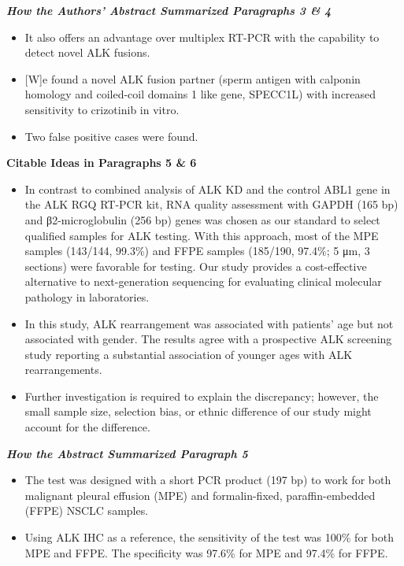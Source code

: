 \documentclass[
]{book}
\providecommand{\tightlist}{%
  \setlength{\itemsep}{0pt}\setlength{\parskip}{0pt}}
\begin{document}
\textbf{\emph{How the Authors' Abstract Summarized Paragraphs 3 \& 4}}

\begin{itemize}
\tightlist
\item
  It also offers an advantage over multiplex RT-PCR with the capability to detect novel ALK fusions.
\item
  {[}W{]}e found a novel ALK fusion partner (sperm antigen with calponin homology and coiled-coil domains 1 like gene, SPECC1L) with increased sensitivity to crizotinib in vitro.
\item
  Two false positive cases were found.
\end{itemize}

\textbf{Citable Ideas in Paragraphs 5 \& 6}

\begin{itemize}
\tightlist
\item
  In contrast to combined analysis of ALK KD and the control ABL1 gene in the ALK RGQ RT-PCR kit, RNA quality assessment with GAPDH (165 bp) and β2-microglobulin (256 bp) genes was chosen as our standard to select qualified samples for ALK testing. With this approach, most of the MPE samples (143/144, 99.3\%) and FFPE samples (185/190, 97.4\%; 5 μm, 3 sections) were favorable for testing. Our study provides a cost-effective alternative to next-generation sequencing for evaluating clinical molecular pathology in laboratories.
\item
  In this study, ALK rearrangement was associated with patients' age but not associated with gender. The results agree with a prospective ALK screening study reporting a substantial association of younger ages with ALK rearrangements.
\item
  Further investigation is required to explain the discrepancy; however, the small sample size, selection bias, or ethnic difference of our study might account for the difference.
\end{itemize}

\textbf{\emph{How the Abstract Summarized Paragraph 5}}

\begin{itemize}
\tightlist
\item
  The test was designed with a short PCR product (197 bp) to work for both malignant pleural effusion (MPE) and formalin-fixed, paraffin-embedded (FFPE) NSCLC samples.
\item
  Using ALK IHC as a reference, the sensitivity of the test was 100\% for both MPE and FFPE. The specificity was 97.6\% for MPE and 97.4\% for FFPE.
\end{itemize}
\end{document}
